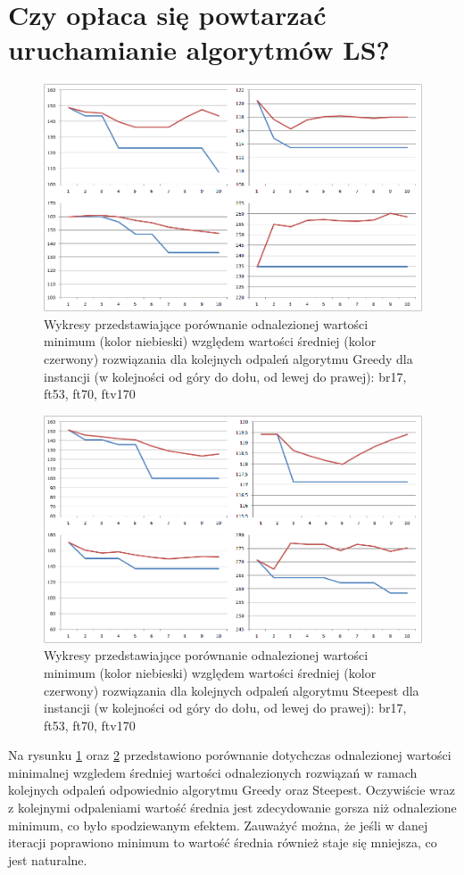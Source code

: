\section{Czy opłaca się powtarzać uruchamianie algorytmów LS?}
\begin{figure}[!h]
\centering\includegraphics[width=12cm]{img/min_vs_avg_g.png}
\caption{Wykresy przedstawiające porównanie odnalezionej wartości minimum (kolor niebieski) względem wartości średniej (kolor czerwony) rozwiązania dla kolejnych odpaleń algorytmu Greedy dla instancji (w kolejności od góry do dołu, od lewej do prawej): br17, ft53, ft70, ftv170}\label{rys:mvsag}
\end{figure}
\begin{figure}[!h]
\centering\includegraphics[width=12cm]{img/min_vs_avg_s.png}
\caption{Wykresy przedstawiające porównanie odnalezionej wartości minimum (kolor niebieski) względem wartości średniej (kolor czerwony) rozwiązania dla kolejnych odpaleń algorytmu Steepest dla instancji (w kolejności od góry do dołu, od lewej do prawej): br17, ft53, ft70, ftv170}\label{rys:mvsas}
\end{figure}

Na rysunku \ref{rys:mvsag} oraz \ref{rys:mvsas} przedstawiono porównanie dotychczas odnalezionej wartości minimalnej wzgledem średniej wartości odnalezionych rozwiązań w ramach kolejnych odpaleń odpowiednio algorytmu Greedy oraz Steepest. Oczywiście wraz z kolejnymi odpaleniami wartość średnia jest zdecydowanie gorsza niż odnalezione minimum, co było spodziewanym efektem. Zauważyć można, że jeśli w danej iteracji poprawiono minimum to wartość średnia również staje się mniejsza, co jest naturalne.

